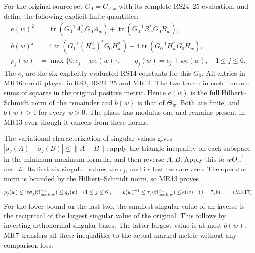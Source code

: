 \documentclass[11pt]{article}
\begin{document}
For the original source set $G_0=G_{U,x}$ with its complete
RS24--25 evaluation, and define the following explicit finite
quantities:
\begin{equation}
 \begin{split}
 e(w)^2&=\operatorname{tr}(G_0^{-1}A_w^*G_0A_w)
            +\operatorname{tr}(G_0^{-1}B_w^*G_0B_w),\\
 b(w)^2&=4\operatorname{tr}(G_0^{-1}(H_w^2)^*G_0H_w^2)
            +4\operatorname{tr}(G_0^{-1}H_w^*G_0H_w),\\
 p_j(w)&=\max\{0,c_j-we(w)\},\qquad
 q_j(w)=c_j+we(w),\quad 1\le j\le6 .
 \end{split}\tag{MR16}
\end{equation}
The $c_j$ are the six explicitly evaluated RS14 constants
for this $G_0$. All entries in MR16 are displayed in
RS2, RS24--25 and MR14. The two traces in each line are
sums of squares in the original positive metric. Hence $e(w)$
is the full Hilbert--Schmidt norm of the remainder and $b(w)$
is that of $\Theta_w$. Both are finite, and $b(w)>0$ for
every $w>0$. The phase has modulus one and remains present
in MR13 even though it cancels from these norms.

The variational characterization of singular values gives
$|\sigma_j(A)-\sigma_j(B)|\le\|A-B\|$: apply the triangle
inequality on each subspace in the minimum-maximum formula,
and then reverse $A,B$. Apply this to $w\Theta_w^{-1}$ and
$\mathscr L$. Its first six singular values are $c_j$, and
its last two are zero. The operator norm is bounded by the
Hilbert--Schmidt norm, so MR13 proves
\begin{equation}
 p_j(w)\le w\sigma_j(\Theta_{{\rm mark},w}^{-1})\le q_j(w)
 \quad(1\le j\le6),\qquad
 b(w)^{-1}\le\sigma_j(\Theta_{{\rm mark},w}^{-1})\le e(w)
 \quad(j=7,8).
 \tag{MR17}
\end{equation}
For the lower bound on the last two, the smallest singular
value of an inverse is the reciprocal of the largest singular
value of the original. This follows by inverting orthonormal
singular bases. The latter largest value is at most $b(w)$.
MR7 transfers all these inequalities to the actual marked
metric without any comparison loss.
\end{document}
